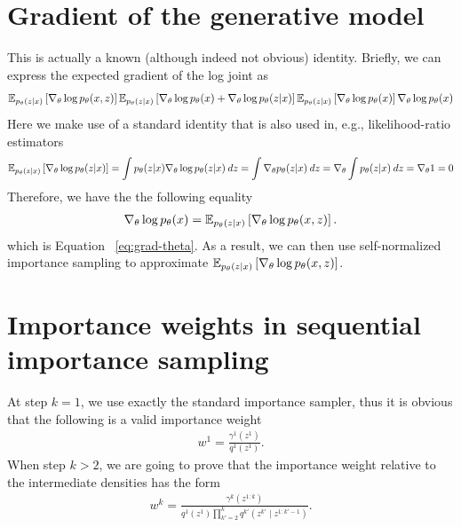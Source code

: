 \documentclass{article}
\theoremstyle{definition}
\begin{document}
\section{Gradient of the generative model}%
\label{appendix:grad-theta}
This is actually a known (although indeed not obvious) identity. Briefly, we can express the expected gradient of the log joint as
\begin{align*}
    \mathbb{E}_{p_\theta(z | x)} 
    \left[
    \nabla_\theta \log p_\theta(x, z)
    \right]
    \mathbb{E}_{p_\theta(z | x)} 
    \left[
    \nabla_\theta \log p_\theta(x) + \nabla_\theta \log p_\theta(z | x)
    \right]
    \mathbb{E}_{p_\theta(z | x)} 
    \left[
    \nabla_\theta \log p_\theta(x) 
    \right]
    \nabla_\theta \log p_\theta(x)
\end{align*}
Here we make use of a standard identity that is also used in, e.g., likelihood-ratio estimators
\begin{align*}
\mathbb{E}_{p_\theta(z | x)}
\left[
    \nabla_\theta \log p_\theta(z | x)
\right] 
=
\int p_\theta(z | x) \nabla_\theta \log p_\theta(z | x) \: dz
=
\int \nabla_\theta p_\theta(z | x) \: dz
=
\nabla_\theta \int p_\theta(z | x) \: dz
=
\nabla_\theta 1
= 
0
\end{align*}
Therefore, we have the the following equality
\begin{align*}
\nabla_\theta \log p_\theta(x) 
= 
\mathbb{E}_{p_\theta(z | x)} 
\left[
\nabla_\theta \log p_\theta(x, z)
\right].
\end{align*}
which is Equation ~\ref{eq:grad-theta}. As a result, we can then use self-normalized importance sampling to approximate     $\mathbb{E}_{p_\theta(z | x)} \left[\nabla_\theta \log p_\theta(x, z) \right]$.

\section{Importance weights in sequential importance sampling}
\label{appendix:sis-weight}
At step $k=1$, we use exactly the standard importance sampler, thus it is obvious that the following is a valid importance weight
\begin{align*}
    w^1 = \frac{\gamma^1(z^1)}{q^1(z^1)}.
\end{align*}
When step $k>2$, we are going to prove that the importance weight relative to the intermediate densities has the form
\begin{align}
    \label{appendix:eq:sis-weight}
    w^k
    = 
    \frac{\gamma^k(z^{1:k})}
         {q^1(z^1) \prod_{k'=2}^k q^{k'}(z^{k'} \mid z^{1:k'-1})}.
\end{align}
\end{document}
